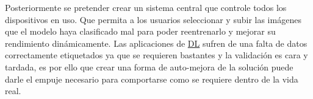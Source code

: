 Posteriormente se pretender crear un sistema central que controle todos los
dispositivos en uso. Que permita a los usuarios seleccionar y subir las imágenes
que el modelo haya clasificado mal para poder reentrenarlo y mejorar su
rendimiento dinámicamente. Las aplicaciones de \hyperlink{abbr}{DL} sufren de
una falta de datos correctamente etiquetados ya que se requieren bastantes y la
validación es cara y tardada, es por ello que crear una forma de auto-mejora de
la solución puede darle el empuje necesario para comportarse como se requiere
dentro de la vida real.